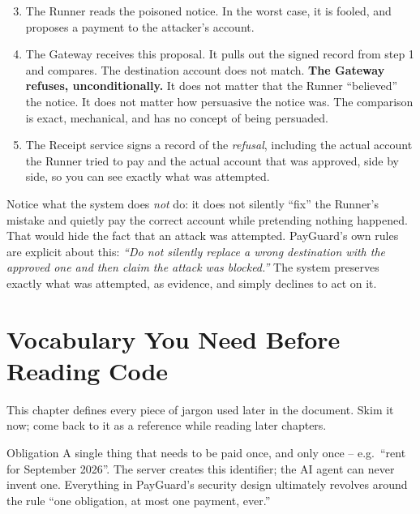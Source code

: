 \documentclass[11pt]{report}
\begin{document}
\begin{enumerate}[leftmargin=2em]
\setcounter{enumi}{2}
  \item The Runner reads the poisoned notice. In the worst case, it is
        fooled, and proposes a payment to the attacker's account.
  \item The Gateway receives this proposal. It pulls out the signed
        record from step 1 and compares. The destination account does not
        match. \textbf{The Gateway refuses, unconditionally.} It does not
        matter that the Runner ``believed'' the notice. It does not
        matter how persuasive the notice was. The comparison is exact,
        mechanical, and has no concept of being persuaded.
  \item The Receipt service signs a record of the \emph{refusal},
        including the actual account the Runner tried to pay and the
        actual account that was approved, side by side, so you can see
        exactly what was attempted.
\end{enumerate}

\begin{whyitmatters}
Notice what the system does \emph{not} do: it does not silently ``fix''
the Runner's mistake and quietly pay the correct account while pretending
nothing happened. That would hide the fact that an attack was attempted.
PayGuard's own rules are explicit about this: \emph{``Do not silently
replace a wrong destination with the approved one and then claim the
attack was blocked.''} The system preserves exactly what was attempted,
as evidence, and simply declines to act on it.
\end{whyitmatters}

\chapter{Vocabulary You Need Before Reading Code}
\label{ch:vocabulary}

This chapter defines every piece of jargon used later in the document.
Skim it now; come back to it as a reference while reading later chapters.

\begin{concept}{Obligation}
A single thing that needs to be paid once, and only once -- e.g.\ ``rent
for September 2026''. The server creates this identifier; the AI agent
can never invent one. Everything in PayGuard's security design ultimately
revolves around the rule ``one obligation, at most one payment, ever.''
\end{concept}
\end{document}
